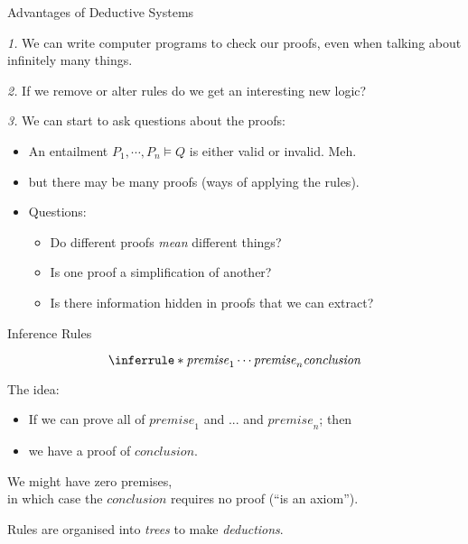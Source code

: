 \documentclass[xetex,aspectratio=169,14pt,hyperref={pdfpagelabels=true,pdflang={en-GB}}]{beamer}
\begin{document}
\begin{frame}
  {Advantages of Deductive Systems}

  \bigskip \emph{1. } We can write computer programs to check our proofs, even
  when talking about infinitely many things.

  \pause
  \bigskip
  \emph{2. }If we remove or alter rules do we get an interesting new logic?

  \pause
  \bigskip
  \emph{3. }We can start to ask questions about the proofs:
  \begin{itemize}
  \item An entailment $P_1, \cdots, P_n \models Q$ is either valid or invalid. Meh.
  \item but there may be many proofs (ways of applying the rules).
  \item Questions:
    \begin{itemize}
    \item Do different proofs \emph{mean} different things?
    \item Is one proof a simplification of another?
    \item Is there information hidden in proofs that we can extract?
    \end{itemize}
  \end{itemize}
\end{frame}

\begin{frame}[t]
  {Inference Rules}

  \begin{displaymath}
    \inferrule*
    {\mathit{premise}_1 \\ \cdots \\ \mathit{premise}_n}
    {\mathit{conclusion}}
  \end{displaymath}

  The idea:
  \begin{itemize}
  \item If we can prove all of $\mathit{premise}_1$ and ... and $\mathit{premise}_n$; then
  \item we have a proof of $\mathit{conclusion}$.
  \end{itemize}

  \pause
  \bigskip

  We might have zero premises, \\
  \quad in which case the $\mathit{conclusion}$
  requires no proof (``is an axiom'').

  \pause
  \bigskip

  Rules are organised into \emph{trees} to make \emph{deductions}.
\end{frame}
\end{document}

